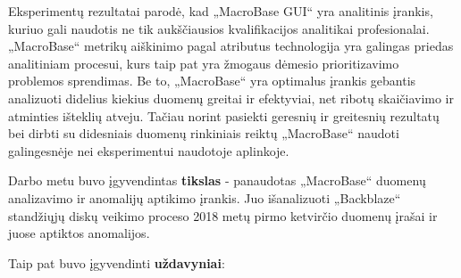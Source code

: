 \documentclass{VUMIFPSkursinis}
\begin{document}
Eksperimentų rezultatai parodė, kad „MacroBase GUI“ yra analitinis įrankis, kuriuo gali naudotis ne tik aukščiausios kvalifikacijos analitikai profesionalai. „MacroBase“ metrikų aiškinimo pagal atributus technologija yra galingas priedas analitiniam procesui, kurs taip pat yra žmogaus dėmesio prioritizavimo problemos sprendimas. Be to, „MacroBase“ yra optimalus įrankis gebantis analizuoti didelius kiekius duomenų greitai ir efektyviai, net ribotų skaičiavimo ir atminties išteklių atveju. Tačiau norint pasiekti geresnių ir greitesnių rezultatų bei dirbti su didesniais duomenų rinkiniais reiktų „MacroBase“ naudoti galingesnėje nei eksperimentui naudotoje aplinkoje.


Darbo metu buvo įgyvendintas \textbf{tikslas} - panaudotas „MacroBase“ duomenų analizavimo ir anomalijų aptikimo įrankis. Juo išanalizuoti „Backblaze“ standžiųjų diskų veikimo proceso 2018 metų pirmo ketvirčio duomenų įrašai ir juose aptiktos anomalijos.\par

Taip pat buvo įgyvendinti \textbf{uždavyniai}:
\end{document}
